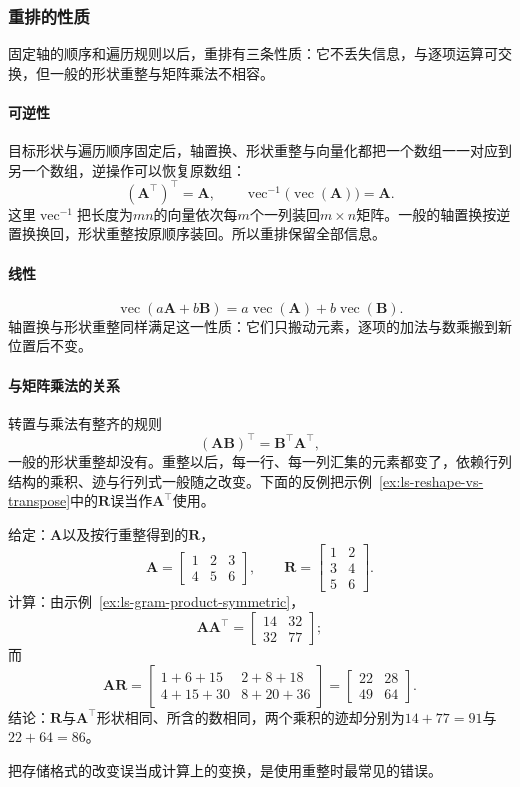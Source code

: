 \subsubsection{重排的性质}

固定轴的顺序和遍历规则以后，重排有三条性质：它不丢失信息，与逐项运算可交换，但一般的形状重整与矩阵乘法不相容。

\paragraph{可逆性}
目标形状与遍历顺序固定后，轴置换、形状重整与向量化都把一个数组一一对应到另一个数组，逆操作可以恢复原数组：
\[
 (\bm A^\top)^\top=\bm A,\qquad
 \operatorname{vec}^{-1}\bigl(\operatorname{vec}(\bm A)\bigr)=\bm A.
\]
这里$\operatorname{vec}^{-1}$把长度为$mn$的向量依次每$m$个一列装回$m\times n$矩阵。一般的轴置换按逆置换换回，形状重整按原顺序装回。所以重排保留全部信息。

\paragraph{线性}
\[
 \operatorname{vec}(a\bm A+b\bm B)=a\operatorname{vec}(\bm A)+b\operatorname{vec}(\bm B).
\]
轴置换与形状重整同样满足这一性质：它们只搬动元素，逐项的加法与数乘搬到新位置后不变。

\paragraph{与矩阵乘法的关系}
转置与乘法有整齐的规则
\[
 (\bm A\bm B)^\top=\bm B^\top\bm A^\top,
\]
一般的形状重整却没有。重整以后，每一行、每一列汇集的元素都变了，依赖行列结构的乘积、迹与行列式一般随之改变。下面的反例把示例~\ref{ex:ls-reshape-vs-transpose}中的$\bm R$误当作$\bm A^\top$使用。
\begin{example}[反例：重整不能代替转置]
\label{ex:ls-reshape-breaks-product}
给定：$\bm A$以及按行重整得到的$\bm R$，
\[
 \bm A=\begin{bmatrix}1&2&3\\4&5&6\end{bmatrix},\qquad
 \bm R=\begin{bmatrix}1&2\\3&4\\5&6\end{bmatrix}.
\]
计算：由示例~\ref{ex:ls-gram-product-symmetric}，
\[
 \bm A\bm A^\top=\begin{bmatrix}14&32\\32&77\end{bmatrix};
\]
而
\[
 \bm A\bm R=\begin{bmatrix}1+6+15&2+8+18\\4+15+30&8+20+36\end{bmatrix}=\begin{bmatrix}22&28\\49&64\end{bmatrix}.
\]
结论：$\bm R$与$\bm A^\top$形状相同、所含的数相同，两个乘积的迹却分别为$14+77=91$与$22+64=86$。
\end{example}
把存储格式的改变误当成计算上的变换，是使用重整时最常见的错误。

